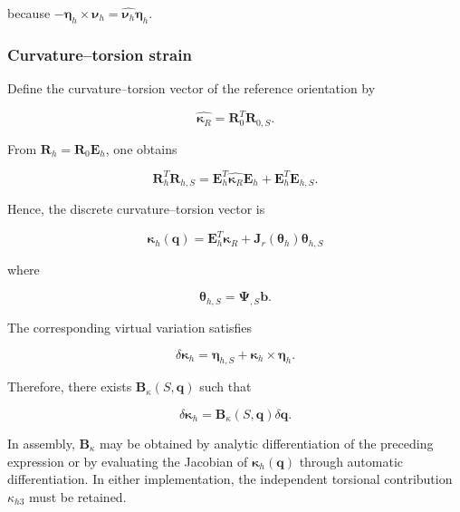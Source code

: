 because \(- \bm{\eta}_{h} \times \bm{\nu}_{h} = \widehat{\bm{\nu}_{h}}\bm{\eta}_{h}\).

\subsubsection{Curvature--torsion strain}\label{sec:galerkin-2-3-2}

Define the curvature--torsion vector of the reference orientation by

\begin{equation}
\label{eq:galerkin-2-21}
\widehat{\bm{\kappa}_{R}} = \mathbf{R}_{0}^{T}\mathbf{R}_{0,S}.
\end{equation}

From \(\mathbf{R}_{h} = \mathbf{R}_{0}\mathbf{E}_{h}\), one obtains

\begin{equation}
\label{eq:galerkin-2-22}
\mathbf{R}_{h}^{T}\mathbf{R}_{h,S} = \mathbf{E}_{h}^{T}\widehat{\bm{\kappa}_{R}}\mathbf{E}_{h} + \mathbf{E}_{h}^{T}\mathbf{E}_{h,S}.
\end{equation}

Hence, the discrete curvature--torsion vector is

\begin{equation}
\label{eq:galerkin-2-23}
\boxed{\bm{\kappa}_{h}\left( \mathbf{q} \right) = \mathbf{E}_{h}^{T}\bm{\kappa}_{R} + \mathbf{J}_{r}\left( \bm{\theta}_{h} \right)\bm{\theta}_{h,S}}
\end{equation}

where

\begin{equation}
\label{eq:galerkin-2-24}
\bm{\theta}_{h,S} = \bm{\Psi}_{,S}\mathbf{b}.
\end{equation}

The corresponding virtual variation satisfies

\begin{equation}
\label{eq:galerkin-2-25}
\delta\bm{\kappa}_{h} = \bm{\eta}_{h,S} + \bm{\kappa}_{h} \times \bm{\eta}_{h}.
\end{equation}

Therefore, there exists \(\mathbf{B}_{\kappa}\left( S,\mathbf{q} \right)\) such that

\begin{equation}
\label{eq:galerkin-2-26}
\delta\bm{\kappa}_{h} = \mathbf{B}_{\kappa}\left( S,\mathbf{q} \right)\delta\mathbf{q}.
\end{equation}

In assembly, \(\mathbf{B}_{\kappa}\) may be obtained by analytic differentiation of the preceding expression or by evaluating the Jacobian of \(\bm{\kappa}_{h}\left( \mathbf{q} \right)\) through automatic differentiation. In either implementation, the independent torsional contribution \(\kappa_{h3}\) must be retained.

